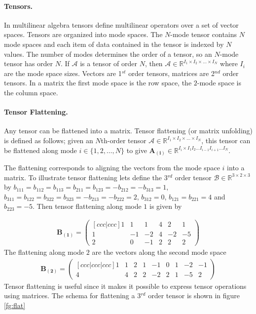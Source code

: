 \documentclass[11pt,a4paper,twoside]{report}
\begin{document}
\paragraph{Tensors.} In multilinear algebra tensors
define multilinear operators over a set of vector
spaces. Tensors are organized into mode spaces. The $N$-mode tensor contains $N$
mode spaces and each item of data contained in the tensor is indexed by $N$
values. The number of modes determines the order of a tensor, so an $N$-mode tensor has order $N$. If
$\mathcal{A}$ is a tensor of
order $N$, then $\mathcal{A} \in \mathbb{R}^{I_1 \times I_2 \times \ldots \times
  I_N}$ where $I_i$ are the mode space sizes. Vectors are 1$^{st}$ order tensors, matrices are 2$^{nd}$ order
tensors. In a matrix the first mode space is the row space, the $2$-mode space
is the column space.

\paragraph{Tensor Flattening.} Any tensor can be flattened into a matrix. Tensor
flattening (or matrix unfolding) is defined as follows; given
an $N$th-order tensor $\mathcal{A} \in \mathbb{R}^{I_1 \times I_2 \times \ldots
  \times I_N}$, this tensor can be flattened along mode $i \in
\{1,2,\ldots,N\}$ to give $\mathbf{A_{(i)}} \in \mathbb{R}^{I_i \times I_1 I_2 \ldots I_{i-1} I_{i+1} \ldots I_N}$. 

The flattening corresponds to aligning the vectors from the mode space $i$ into a matrix. To illustrate tensor flattening lets define the 3$^{rd}$ order
  tensor $\mathcal{B} \in \mathbb{R}^{3\times 2\times 3}$ by $b_{111} = b_{112}
  = b_{113} = b_{211} = b_{123} = -b_{212} = -b_{313} = 1$, $b_{311} = b_{122} =
  b_{322} = b_{323} = -b_{213} = -b_{222} = 2$, $b_{312} = 0$, $b_{121} =
  b_{221} = 4$ and $b_{223} = -5$. Then tensor flattening along mode $1$ is given by

\begin{align*}
\mathbf{B_{(1)}} = 
\begin{pmatrix}[ccc|ccc]
1&1&1&4&2&1\\
1&-1&-2&4&-2&-5\\
2&0&-1&2&2&2
\end{pmatrix}
\end{align*}
The flattening along mode $2$ are the vectors along the second mode space
\begin{align*}
\mathbf{B_{(2)}} = 
\begin{pmatrix}[ccc|ccc|ccc]
1&1&2&1&-1&0&1&-2&-1\\
4&4&2&2&-2&2&1&-5&2
\end{pmatrix}
\end{align*}
Tensor flattening is useful since it makes it possible to express tensor
operations using matrices. The schema for flattening a 3$^{rd}$ order tensor is shown in figure \ref{fg:flat}
\end{document}

